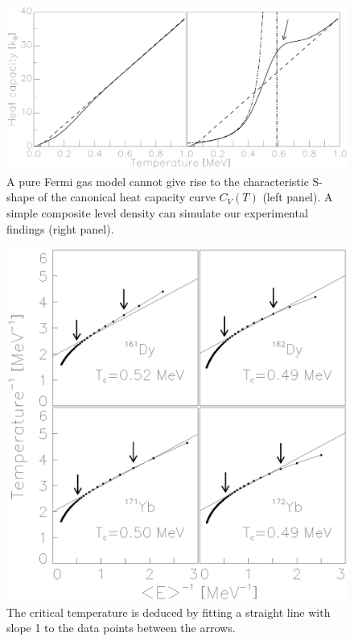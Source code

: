 \clearpage

\begin{figure}\centering
\includegraphics[totalheight=8.9cm]{fig3.eps}
\caption{A pure Fermi gas model cannot give rise to the characteristic S-shape
of the canonical heat capacity curve $C_V(T)$ (left panel). A simple composite
level density can simulate our experimental findings (right panel).}
\label{fig:simulation} 
\end{figure}

\clearpage

\begin{figure}\centering
\includegraphics[totalheight=17.9cm]{fig4.eps}
\caption{The critical temperature is deduced by fitting a straight line with 
slope 1 to the data points between the arrows.}
\label{fig:critical} 
\end{figure}




